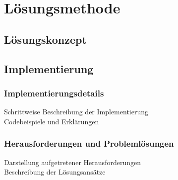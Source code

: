 \section{Lösungsmethode}

\subsection[Lösungskonzept]{Lösungskonzept}


\subsection[Implementierung]{Implementierung}
\subsubsection[Implementierungsdetails]{Implementierungsdetails}
Schrittweise Beschreibung der Implementierung\\
Codebeispiele und Erklärungen

\subsubsection[Herausforderungen und Problemlösungen]{Herausforderungen und Problemlösungen}
Darstellung aufgetretener Herausforderungen \\
Beschreibung der Lösungsansätze